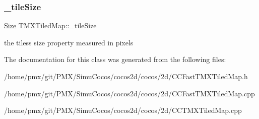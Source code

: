 \subsubsection{\texorpdfstring{\+\_\+tile\+Size}{\_tileSize}}
{\footnotesize\ttfamily \hyperlink{classSize}{Size} T\+M\+X\+Tiled\+Map\+::\+\_\+tile\+Size\hspace{0.3cm}{\ttfamily [protected]}}

the tiles\textquotesingle{}s size property measured in pixels 

The documentation for this class was generated from the following files\+:\begin{DoxyCompactItemize}
\item 
/home/pmx/git/\+P\+M\+X/\+Simu\+Cocos/cocos2d/cocos/2d/C\+C\+Fast\+T\+M\+X\+Tiled\+Map.\+h\item 
/home/pmx/git/\+P\+M\+X/\+Simu\+Cocos/cocos2d/cocos/2d/C\+C\+Fast\+T\+M\+X\+Tiled\+Map.\+cpp\item 
/home/pmx/git/\+P\+M\+X/\+Simu\+Cocos/cocos2d/cocos/2d/C\+C\+T\+M\+X\+Tiled\+Map.\+cpp\end{DoxyCompactItemize}
